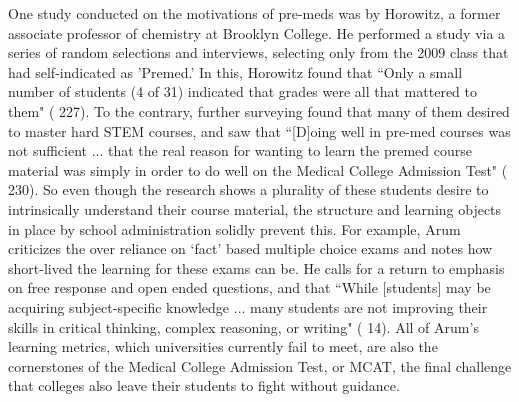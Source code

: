 \documentclass [12pt]{article}
\begin{document}
\begin{flushleft}
One study conducted on the motivations of pre-meds was by Horowitz, a former associate professor of chemistry at Brooklyn College. He performed a study via a series of random selections and interviews, selecting only from the 2009 class that had self-indicated as 'Premed.' In this, Horowitz found that  {``}Only a small number of students (4 of 31) indicated that grades were all that mattered to them" (\cite{Horowitz-2010} 227). To the contrary, further surveying found that many of them desired to master hard STEM courses, and saw that {``}[D]oing well in pre-med courses was not sufficient ... that the real reason for wanting to learn the premed course material was simply in order to do well on the Medical College Admission Test" (\cite{Horowitz-2010} 230). So even though the research shows a plurality of these students desire to intrinsically understand their course material, the structure and learning objects in place by school administration solidly prevent this. For example, Arum criticizes the over reliance on {`}fact' based multiple choice exams and notes how short-lived the learning for these exams can be. He calls for a return to emphasis on free response and open ended questions, and that {``}While [students] may be acquiring subject-specific knowledge ...  many students are not improving their skills in critical thinking, complex reasoning, or writing" (\cite{Arum-2011} 14). All of Arum's learning metrics, which universities currently fail to meet, are also the cornerstones of the Medical College Admission Test, or MCAT, the final challenge that colleges also leave their students to fight without guidance.


\end{flushleft}
\end{document}
